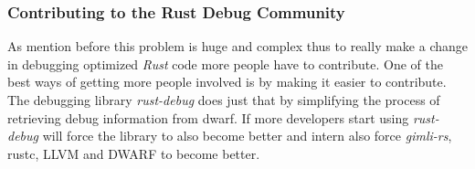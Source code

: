 \subsubsection{Contributing to the Rust Debug Community}
As mention before this problem is huge and complex thus to really make a change in debugging optimized \emph{Rust} code more people have to contribute.
One of the best ways of getting more people involved is by making it easier to contribute.
The debugging library \emph{rust-debug} does just that by simplifying the process of retrieving debug information from dwarf.
If more developers start using \emph{rust-debug} will force the library to also become better and intern also force \emph{gimli-rs}, \gls{rustc}, \gls{LLVM} and \gls{DWARF} to become better.


